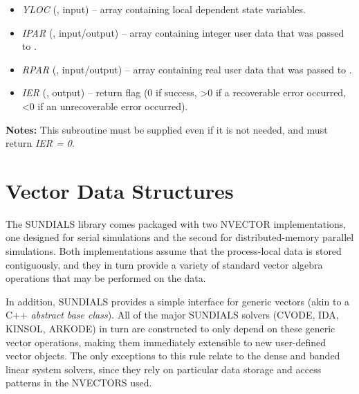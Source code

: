 \documentclass[letterpaper,10pt,english]{sphinxmanual}
\begin{document}
\begin{enumerate}
\begin{fulllineitems}
\begin{description}
\begin{itemize}
\item {} 
\emph{YLOC} (, input) -- array containing local
dependent state variables.

\item {} 
\emph{IPAR} (, input/output) -- array containing
integer user data that was passed to
{\hyperref[f_interface/Usage:f/_/FARKMALLOC]{}}.

\item {} 
\emph{RPAR} (, input/output) -- array containing
real user data that was passed to {\hyperref[f_interface/Usage:f/_/FARKMALLOC]{}}.

\item {} 
\emph{IER} (, output) -- return flag (0 if success, \textgreater{}0
if a recoverable error occurred, \textless{}0 if an unrecoverable
error occurred).

\end{itemize}

\end{description}

\textbf{Notes:}
This subroutine must be supplied even if it is not needed, and
must return \emph{IER = 0}.

\end{fulllineitems}


\end{enumerate}


\chapter{Vector Data Structures}
\label{nvectors/index:nvectors}\label{nvectors/index::doc}\label{nvectors/index:vector-data-structures}
The SUNDIALS library comes packaged with two NVECTOR implementations,
one designed for serial simulations and the second for
distributed-memory parallel simulations.  Both implementations assume
that the process-local data is stored contiguously, and they in turn
provide a variety of standard vector algebra operations that may be
performed on the data.

In addition, SUNDIALS provides a simple interface for generic vectors
(akin to a C++ \emph{abstract base class}).  All of the major SUNDIALS
solvers (CVODE, IDA, KINSOL, ARKODE) in turn are constructed to only
depend on these generic vector operations, making them immediately
extensible to new user-defined vector objects.  The only exceptions to
this rule relate to the dense and banded linear system solvers, since
they rely on particular data storage and access patterns in the
NVECTORS used.
\end{document}
